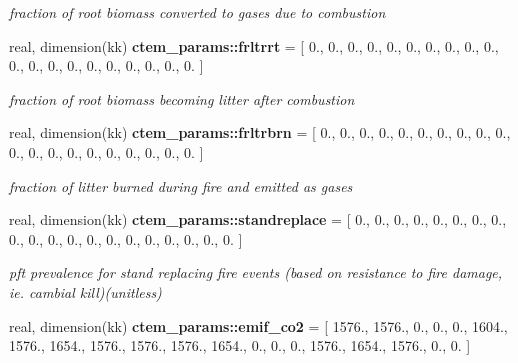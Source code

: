 \begin{DoxyCompactItemize}
\begin{DoxyCompactList}\small\item\em fraction of root biomass converted to gases due to combustion \end{DoxyCompactList}\item 
\hypertarget{namespacectem__params_a6081b9662214fa2aa63c3080fc1868ae}{}real, dimension(kk) {\bfseries ctem\+\_\+params\+::frltrrt} = \mbox{[} 0., 0., 0., 0., 0., 0., 0., 0., 0., 0., 0., 0., 0., 0., 0., 0., 0., 0., 0., 0. \mbox{]}\label{namespacectem__params_a6081b9662214fa2aa63c3080fc1868ae}

\begin{DoxyCompactList}\small\item\em fraction of root biomass becoming litter after combustion \end{DoxyCompactList}\item 
\hypertarget{namespacectem__params_a7f36ae05e8efb516582037530650eac9}{}real, dimension(kk) {\bfseries ctem\+\_\+params\+::frltrbrn} = \mbox{[} 0., 0., 0., 0., 0., 0., 0., 0., 0., 0., 0., 0., 0., 0., 0., 0., 0., 0., 0., 0. \mbox{]}\label{namespacectem__params_a7f36ae05e8efb516582037530650eac9}

\begin{DoxyCompactList}\small\item\em fraction of litter burned during fire and emitted as gases \end{DoxyCompactList}\item 
\hypertarget{namespacectem__params_a5086cd6fb3b85a2882e7aa2683598f9b}{}real, dimension(kk) {\bfseries ctem\+\_\+params\+::standreplace} = \mbox{[} 0., 0., 0., 0., 0., 0., 0., 0., 0., 0., 0., 0., 0., 0., 0., 0., 0., 0., 0., 0. \mbox{]}\label{namespacectem__params_a5086cd6fb3b85a2882e7aa2683598f9b}

\begin{DoxyCompactList}\small\item\em pft prevalence for stand replacing fire events (based on resistance to fire damage, ie. cambial kill)(unitless) \end{DoxyCompactList}\item 
\hypertarget{namespacectem__params_a07af3ba9ecabbbac0d884937d56e1b7a}{}real, dimension(kk) {\bfseries ctem\+\_\+params\+::emif\+\_\+co2} = \mbox{[} 1576., 1576., 0., 0., 0., 1604., 1576., 1654., 1576., 1576., 1576., 1654., 0., 0., 0., 1576., 1654., 1576., 0., 0. \mbox{]}\label{namespacectem__params_a07af3ba9ecabbbac0d884937d56e1b7a}


\end{DoxyCompactItemize}
